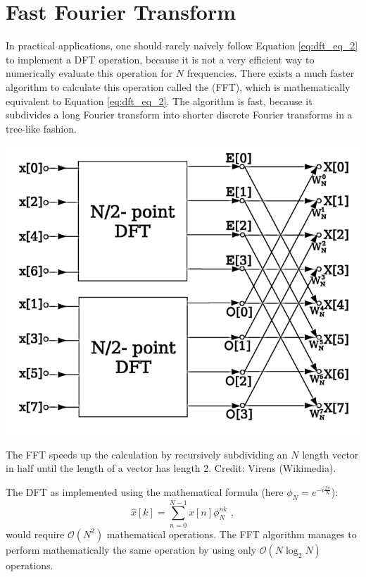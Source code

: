 

\section{Fast Fourier Transform}

In practical applications, one should rarely naively follow Equation
\ref{eq:dft_eq_2} to implement a DFT operation, because it is not a
very efficient way to numerically evaluate this operation for $N$
frequencies. There exists a much faster algorithm to calculate this
operation called the  (FFT), which is mathematically equivalent to Equation
\ref{eq:dft_eq_2}. The algorithm is fast, because it subdivides a long
Fourier transform into shorter discrete Fourier transforms in a
tree-like fashion.

\begin{marginfigure}
  \begin{center}
    \includegraphics[width=\textwidth]{ch15/figures/butterfly.png}
  \end{center}
  \caption{The FFT speeds up the calculation by recursively subdividing an $N$ 
  length vector in half until the length of a vector has length 2. Credit: Virens (Wikimedia).}
\end{marginfigure}

The DFT as implemented using the mathematical formula (here $\phi_N
  = e^{-i\frac{2\pi}{N}}$):
\begin{equation}
  \hat{x}[k]=\sum_{n=0}^{N-1}x[n]\phi_N^{nk} \,\,,
  \label{eq:dft_eq_2}
\end{equation}
would require $\mathcal{O}(N^2)$ mathematical operations. The FFT
algorithm manages to perform mathematically the same operation by
using only $\mathcal{O}(N\log_2{N})$ operations.

